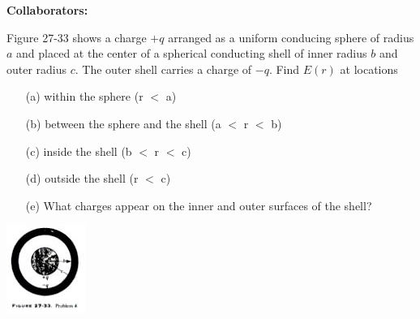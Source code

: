 \documentclass[11pt,letterpaper,boxed]{hmcpset}
\begin{document}
	
	\noindent\textbf{Collaborators:} 
	
	
	\begin{problem}[HRK P27.4] 
		Figure 27-33 shows a charge $+q$ arranged as a uniform conducing sphere of radius $a$ and placed at the center of a spherical conducting shell of inner radius $b$ and outer radius $c$. The outer shell carries a charge of $-q$. Find $E(r)$ at locations 
		
		\begin{enumerate}
			\item [(a)] within the sphere (r $<$ a)
			\item [(b)] between the sphere and the shell (a $<$ r $<$ b)
			\item [(c)] inside the shell (b $<$ r $<$ c)
			\item [(d)] outside the shell (r $<$ c)
			\item [(e)] What charges appear on the inner and outer surfaces of the shell?
		\end{enumerate}
	
		\begin{center}
		\includegraphics[scale=.7]{fig2733.jpg}
		\end{center}
		
	\end{problem}
	
	\begin{solution}
		\vfill
	\end{solution}
	\newpage
\end{document}
